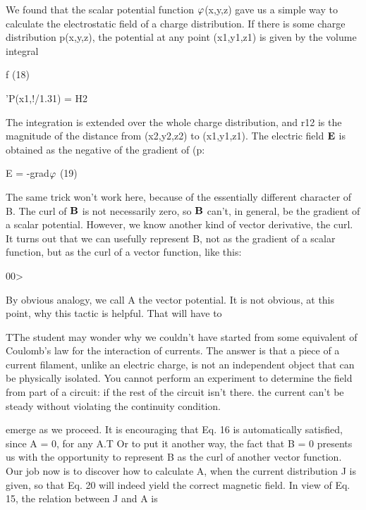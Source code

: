 We found that the scalar potential function $\varphi$(x,y,z) gave us a
simple way to calculate the electrostatic field of a charge distribution.
If there is some charge distribution p(x,y,z), the potential at any
point (x1,y1,z1) is given by the volume integral

\begin{equation}
\end{equation}
f  (18)

'P(x1,!/1.31) = H2

The integration is extended over the whole charge distribution, and
r12 is the magnitude of the distance from (x2,y2,z2) to (x1,y1,z1). The
electric field $\mathbf{E}$ is obtained as the negative of the gradient of (p:

\begin{equation}
\end{equation}
E = -grad$\varphi$ (19)

The same trick won't work here, because of the essentially different
character of B. The curl of $\mathbf{B}$ is not necessarily zero, so $\mathbf{B}$ can't, in
general, be the gradient of a scalar potential. However, we know
another kind of vector derivative, the curl. It turns out that we can
usefully represent B, not as the gradient of a scalar function, but as
the curl of a vector function, like this:

\begin{equation}
\end{equation}
00>

By obvious analogy, we call A the vector potential. It is not
obvious, at this point, why this tactic is helpful. That will have to

TThe student may wonder why we couldn't have started from some equivalent of
Coulomb's law for the interaction of currents. The answer is that a piece of a current
filament, unlike an electric charge, is not an independent object that can be physically
isolated. You cannot perform an experiment to determine the field from part of a
circuit: if the rest of the circuit isn't there. the current can't be steady without violating
the continuity condition.

 

emerge as we proceed. It is encouraging that Eq. 16 is automatically
satisfied, since \div \curl A = 0, for any A.T Or to put it another way,
the fact that \div B = 0 presents us with the opportunity to represent
B as the curl of another vector function. Our job now is to discover
how to calculate A, when the current distribution J is given, so that
Eq. 20 will indeed yield the correct magnetic field. In view of Eq. 15,
the relation between J and A is

